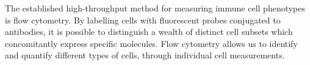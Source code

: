 


The established high-throughput method for measuring immune cell phenotypes is flow cytometry.
By labelling cells with fluorescent probes conjugated to antibodies, it is possible to distinguish a wealth of distinct cell
subsets which concomitantly express specific molecules.
Flow cytometry allows us to identify and quantify different types of cells, through individual cell measurements.

